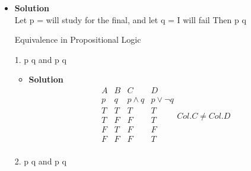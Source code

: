 \documentclass[11pt]{article}
\begin{document}
\begin{itemize}

\item \textbf{Solution}\\
Let p = will study for the final, and let q =  I will fail   
Then p  q \\




\begin{flushleft}
{\Large Equivalence in Propositional Logic}
\end{flushleft}



\begin{flushleft}
{\large 1. p \land q \hspace{.5cm}and \hspace{.5cm} p \lor \neg q}
\end{flushleft}



\begin{itemize}

\item \textbf{Solution}\\

\begin{displaymath}
\begin{array}{|c|c|c|c|}
A & B & C & D \\
p & q & p \land q & p \lor \neg q\\ 
T & T & T & T\\
T & F & F & T\\
F & T & F & F\\
F & F & F & T\\
\end{array}
Col. C \neq Col. D
\end{displaymath}
\end{itemize}




\begin{flushleft}
{\large 2. p \lor \hspace{.2cm} q \hspace{.5cm} and \hspace{.5cm} \neg  p  \land \neg q}
\end{flushleft}



\begin{itemize}


\end{itemize}
\end{itemize}
\end{document}
